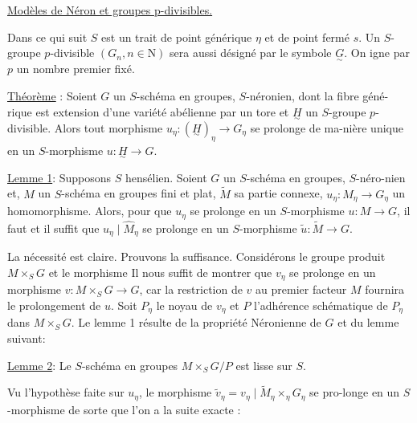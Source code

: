 \uline{Modèles de Néron et groupes p-divisibles.}

Dans ce qui suit $S$ est un trait de point générique $\eta$ et de point fermé $s$. Un $S$-groupe $p$-divisible $(G_n,n\in\mathrm N)$ sera aussi désigné par le symbole $\underset{\sim}{G}$. On igne par $p$ un nombre premier fixé.

\uline{Théorème} : Soient $G$ un $S$-schéma en groupes, $S$-néronien, \inserted{[}dont la fibre géné-rique est extension d'une variété abélienne par un tore\inserted{]} et $\underset{\sim}{H}$ un $S$-groupe $p$-divisible. Alors tout morphisme $u_\eta:(\underset{\sim}{H})_\eta\longrightarrow G_\eta$ se prolonge de ma-nière unique en un $S$-morphisme $u:\underset{\sim}{H}\longrightarrow G$.

\uline{Lemme 1}: Supposons $S$ hensélien. Soient $G$ un $S$-schéma en groupes, $S$-néro-nien et, $M$ un $S$-schéma en groupes fini et plat, $\widetilde M$ sa partie connexe,  $u_\eta:M_\eta\longrightarrow G_\eta$ un homomorphisme. Alors, pour que $u_\eta$ se prolonge en un $S$-morphisme $u:M\longrightarrow G$, il faut et il suffit que $u_\eta\mid\widehat M_\eta$ se prolonge en un $S$-morphisme $\widetilde u:\widetilde M\longrightarrow G$.

La nécessité est claire. Prouvons la suffisance. Considérons le groupe produit $M\times_SG$ et le morphisme
Il nous suffit de montrer que $v_\eta$ se prolonge en un morphisme $v:M\times_SG\longrightarrow G$, car la restriction de $v$ au premier facteur $M$ fournira le prolongement de $u$. Soit $P_\eta$ le noyau de $v_\eta$ et $P$ l'adhérence schématique de $P_\eta$ dans $M\times_SG$. Le lemme 1 résulte de la propriété Néronienne de $G$ et du lemme suivant:

\uline{Lemme 2}: Le $S$-schéma en groupes $M\times_SG/P$  est lisse sur $S$.

Vu l'hypothèse faite sur $u_\eta$, le morphisme $\widetilde v_\eta=v_\eta\mid\widetilde M_\eta\times_\eta G_\eta$ se pro-longe en un $S$-morphisme
de sorte que l'on a la suite exacte :

